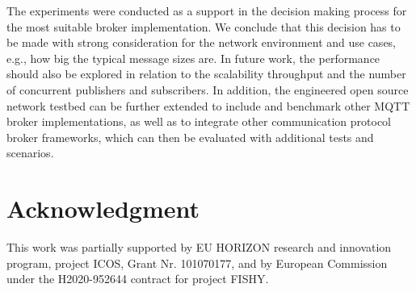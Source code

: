 \documentclass[conference]{IEEEtran}
\begin{document}
The experiments were conducted as a support in the decision making process for the most suitable broker implementation. 
We conclude that this decision has to be made with strong consideration for the network environment and use cases, e.g., how big the typical message sizes are. In future work, the performance should also be explored in relation to the scalability throughput and the number of concurrent
publishers and subscribers. In addition, the engineered open source network testbed can be further extended to include and benchmark
other MQTT broker implementations, as well as to integrate other communication protocol broker frameworks, which can then be evaluated with  additional tests and scenarios.


\section*{Acknowledgment}

This work was partially supported by EU HORIZON research and
innovation program, project ICOS, Grant Nr. 101070177,  and by  European Commission under the H2020-952644 contract for project FISHY.

  



\end{document}
